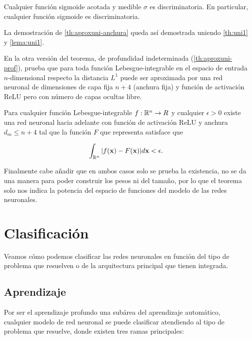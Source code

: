\begin{lema}
  Cualquier función sigmoide acotada y medible $\sigma$ es discriminatoria. En particular, cualquier función sigmoide es discriminatoria.
  \label{lema:uni1}
\end{lema}

La demostración de \autoref{th:aproxuni-anchura} queda así demostrada uniendo \autoref{th:uni1} y \autoref{lema:uni1}.

En la otra versión del teorema, de profundidad indeterminada (\autoref{th:aproxuni-prof}), prueba que para toda función Lebesgue-integrable en el espacio de entrada $n$-dimensional respecto la distancia $L^1$ puede ser aproximada por una red neuronal de dimensiones de capa fija $n + 4$ (anchura fija) y función de activación ReLU pero con número de capas ocultas libre.

\begin{teorema}
  Para cualquier función Lebesgue-integrable $f: \mathbb{R}^n \to R$ y cualquier $\epsilon > 0$ existe una red neuronal hacia adelante con función de activación ReLU y anchura $d_m \leq n + 4$ tal que la función $F$ que representa satisface que

  $$\int_{\mathbb{R}^n} |f(\textbf{x}) - F(\textbf{x})| d\textbf{x} < \epsilon.$$
  \label{th:aproxuni-prof}
\end{teorema}

Finalmente cabe añadir que en ambos casos solo se prueba la existencia, no se da una manera para poder construir los pesos ni del tamaño, por lo que el teorema solo nos indica la potencia del espacio de funciones del modelo de las redes neuronales.

\section{Clasificación}

Veamos cómo podemos clasificar las redes neuronales en función del tipo de problema que resuelven o de la arquitectura principal que tienen integrada.

\subsection{Aprendizaje}

Por ser el aprendizaje profundo una subárea del aprendizaje automático, cualquier modelo de red neuronal se puede clasificar atendiendo al tipo de problema que resuelve, donde existen tres ramas principales:

